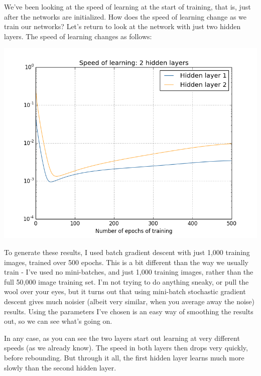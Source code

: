 \documentclass[a4paper,twoside,10pt]{book}
\begin{document}
We've been looking at the speed of learning at the start of training, that is, just after the networks are initialized. How does the speed of learning change as we train our networks? Let's return to look at the network with just two hidden layers. The speed of learning changes as follows:
\begin{center}
	\includegraphics[width=0.7\linewidth]{figures/ch5/training_speed_2_layers}
\end{center}
To generate these results, I used batch gradient descent with just 1,000 training images, trained over 500 epochs. This is a bit different than the way we usually train - I've used no mini-batches, and just 1,000 training images, rather than the full 50,000 image training set. I'm not trying to do anything sneaky, or pull the wool over your eyes, but it turns out that using mini-batch stochastic gradient descent gives much noisier (albeit very similar, when you average away the noise) results. Using the parameters I've chosen is an easy way of smoothing the results out, so we can see what's going on.

In any case, as you can see the two layers start out learning at very different speeds (as we already know). The speed in both layers then drops very quickly, before rebounding. But through it all, the first hidden layer learns much more slowly than the second hidden layer.
\end{document}

